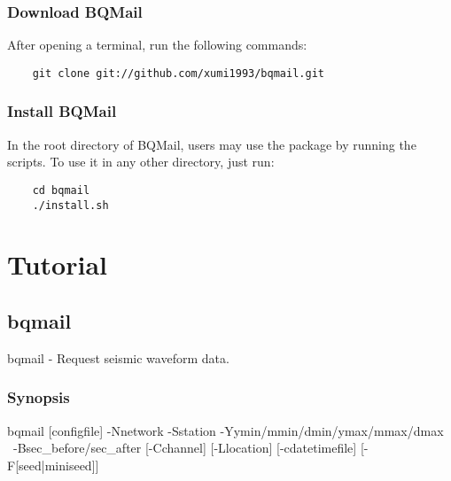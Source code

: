 \documentclass[12pt, a4paper]{report}
\begin{document}
\subsection{Download BQMail}
After opening a terminal, run the following commands:
\begin{lstlisting}
	git clone git://github.com/xumi1993/bqmail.git
\end{lstlisting}
\subsection{Install BQMail}
In the root directory of BQMail, users may use the package by running the scripts. To use it in any other directory, just run:
\begin{lstlisting}
	cd bqmail
	./install.sh
\end{lstlisting}

\chapter{Tutorial}
\section{bqmail}
bqmail - Request seismic waveform data.
\subsection{Synopsis}
{\tb bqmail} [{\ti configfile}] {\tb -N}{\ti network} {\tb -S}{\ti station} {\tb -Y}{\ti ymin/mmin/dmin/ymax/mmax/dmax}\\\
 {\tb -B}{\ti sec\_before/sec\_after} [{\tb -C}{\ti channel}] [{\tb -L}{\ti location}] [{\tb -c}{\ti datetimefile}] [{\tb -F[{\ti seed}|{\ti miniseed}]}]
\end{document}
